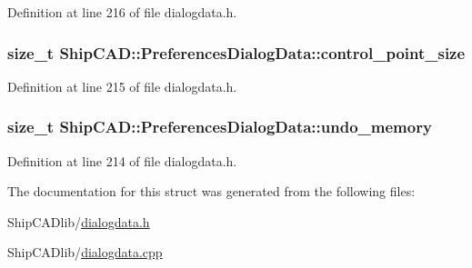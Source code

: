 Definition at line 216 of file dialogdata.\+h.

\subsubsection[{\texorpdfstring{control\+\_\+point\+\_\+size}{control_point_size}}]{\setlength{\rightskip}{0pt plus 5cm}size\+\_\+t Ship\+C\+A\+D\+::\+Preferences\+Dialog\+Data\+::control\+\_\+point\+\_\+size}\hypertarget{structShipCAD_1_1PreferencesDialogData_a53ba0a8f8b1cf70ea78d1162703abc6c}{}\label{structShipCAD_1_1PreferencesDialogData_a53ba0a8f8b1cf70ea78d1162703abc6c}


Definition at line 215 of file dialogdata.\+h.

\subsubsection[{\texorpdfstring{undo\+\_\+memory}{undo_memory}}]{\setlength{\rightskip}{0pt plus 5cm}size\+\_\+t Ship\+C\+A\+D\+::\+Preferences\+Dialog\+Data\+::undo\+\_\+memory}\hypertarget{structShipCAD_1_1PreferencesDialogData_a221dfa5e704ab65d7ea8552736738da2}{}\label{structShipCAD_1_1PreferencesDialogData_a221dfa5e704ab65d7ea8552736738da2}


Definition at line 214 of file dialogdata.\+h.



The documentation for this struct was generated from the following files\+:\begin{DoxyCompactItemize}
\item 
Ship\+C\+A\+Dlib/\hyperlink{dialogdata_8h}{dialogdata.\+h}\item 
Ship\+C\+A\+Dlib/\hyperlink{dialogdata_8cpp}{dialogdata.\+cpp}\end{DoxyCompactItemize}
